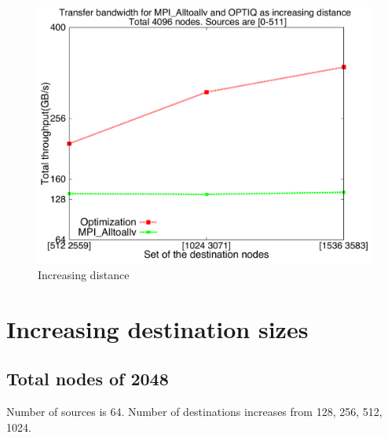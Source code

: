 \documentclass[letter]{article}
\begin{document}
\begin{figure}[h]
\vspace{-0.1in}
\centering
\includegraphics[scale=0.40]{report_figures/incrdist/incrdist_4k.pdf}
\vspace{-0.1in}
\caption{Increasing distance}
\vspace{-0.1in}
\label{fig:incrdist_4k}
\end{figure}

\clearpage
\newpage






\clearpage
\newpage

\section {Increasing destination sizes}

\subsection{Total nodes of 2048}

Number of sources is 64. Number of destinations increases from 128, 256, 512, 1024. 
\end{document}

